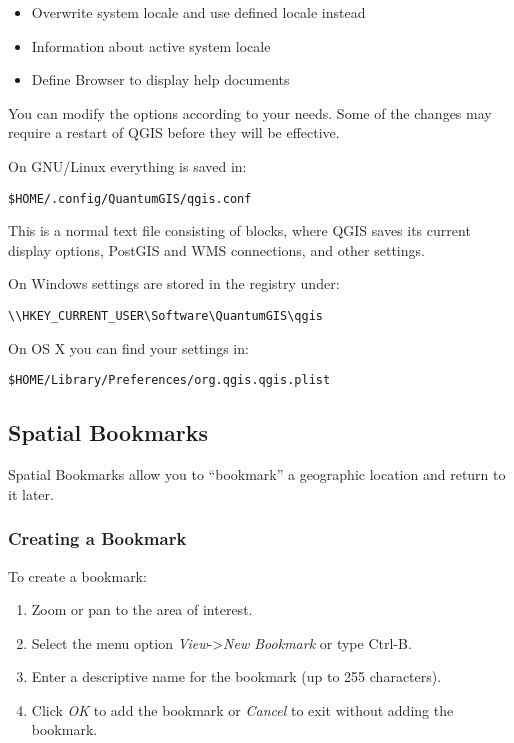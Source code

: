 
\begin{itemize}
\item Overwrite system locale and use defined locale instead
\item Information about active system locale
\end{itemize}


\begin{itemize}
\item Define Browser to display help documents
\end{itemize}

You can modify the options according to your needs. Some of the changes may 
require a restart of QGIS before they will be effective.

On GNU/Linux everything is saved in:
\begin{verbatim}
$HOME/.config/QuantumGIS/qgis.conf
\end{verbatim}
This is a normal text file consisting of blocks, where QGIS saves its current
display options, PostGIS and WMS connections, and other settings.

On Windows settings are stored in the registry under:
\begin{verbatim}
\\HKEY_CURRENT_USER\Software\QuantumGIS\qgis
\end{verbatim}

On OS X you can find your settings in:
\begin{verbatim}
$HOME/Library/Preferences/org.qgis.qgis.plist
\end{verbatim}


\subsection{Spatial Bookmarks}\label{sec:bookmarks}

Spatial Bookmarks allow you to ``bookmark'' a geographic location and return to it later.

\subsubsection{Creating a Bookmark}
To create a bookmark:
\begin{enumerate}
\item Zoom or pan to the area of interest.
\item Select the menu option \textit{View}->\textit{New Bookmark} or type Ctrl-B.
\item Enter a descriptive name for the bookmark (up to 255 characters).
\item Click \textit{OK} to add the bookmark or \textit{Cancel} to exit without adding the bookmark.
\end{enumerate}

